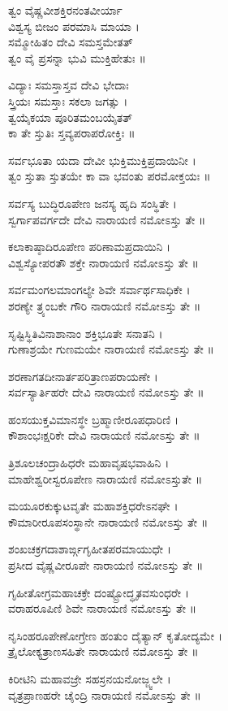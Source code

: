 ತ್ವಂ ವೈಷ್ಣವೀಶಕ್ತಿರನಂತವೀರ್ಯಾ\\
      ವಿಶ್ವಸ್ಯ ಬೀಜಂ ಪರಮಾಸಿ ಮಾಯಾ ।\\
ಸಮ್ಮೋಹಿತಂ ದೇವಿ ಸಮಸ್ತಮೇತತ್\\
      ತ್ವಂ ವೈ ಪ್ರಸನ್ನಾ ಭುವಿ ಮುಕ್ತಿಹೇತುಃ ॥

ವಿದ್ಯಾಃ ಸಮಸ್ತಾಸ್ತವ ದೇವಿ ಭೇದಾಃ\\
        ಸ್ತ್ರಿಯಃ ಸಮಸ್ತಾಃ ಸಕಲಾ ಜಗತ್ಸು ।\\
ತ್ವಯೈಕಯಾ ಪೂರಿತಮಂಬಯೈತತ್\\
        ಕಾ ತೇ ಸ್ತುತಿಃ ಸ್ತವ್ಯಪರಾಪರೋಕ್ತಿಃ ॥

ಸರ್ವಭೂತಾ ಯದಾ ದೇವೀ ಭುಕ್ತಿಮುಕ್ತಿಪ್ರದಾಯಿನೀ ।\\
ತ್ವಂ ಸ್ತುತಾ ಸ್ತುತಯೇ ಕಾ ವಾ ಭವಂತು ಪರಮೋಕ್ತಯಃ ॥

ಸರ್ವಸ್ಯ ಬುದ್ಧಿರೂಪೇಣ ಜನಸ್ಯ ಹೃದಿ ಸಂಸ್ಥಿತೇ ।\\
ಸ್ವರ್ಗಾಪವರ್ಗದೇ ದೇವಿ ನಾರಾಯಣಿ ನಮೋಽಸ್ತು ತೇ ॥

ಕಲಾಕಾಷ್ಠಾದಿರೂಪೇಣ ಪರಿಣಾಮಪ್ರದಾಯಿನಿ ।\\
ವಿಶ್ವಸ್ಯೋಪರತೌ ಶಕ್ತೇ ನಾರಾಯಣಿ ನಮೋಽಸ್ತು ತೇ ॥

ಸರ್ವಮಂಗಲಮಾಂಗಲ್ಯೇ ಶಿವೇ ಸರ್ವಾರ್ಥಸಾಧಿಕೇ ।\\
ಶರಣ್ಯೇ ತ್ರ್ಯಂಬಕೇ ಗೌರಿ ನಾರಾಯಣಿ ನಮೋಽಸ್ತು ತೇ ॥

ಸೃಷ್ಟಿಸ್ಥಿತಿವಿನಾಶಾನಾಂ ಶಕ್ತಿಭೂತೇ ಸನಾತನಿ ।\\
ಗುಣಾಶ್ರಯೇ ಗುಣಮಯೇ ನಾರಾಯಣಿ ನಮೋಽಸ್ತು ತೇ ॥

ಶರಣಾಗತದೀನಾರ್ತಪರಿತ್ರಾಣಪರಾಯಣೇ ।\\
ಸರ್ವಸ್ಯಾರ್ತಿಹರೇ ದೇವಿ ನಾರಾಯಣಿ ನಮೋಽಸ್ತು ತೇ ॥

ಹಂಸಯುಕ್ತವಿಮಾನಸ್ಥೇ ಬ್ರಹ್ಮಾಣೀರೂಪಧಾರಿಣಿ ।\\
ಕೌಶಾಂಭಃಕ್ಷರಿಕೇ ದೇವಿ ನಾರಾಯಣಿ ನಮೋಽಸ್ತು ತೇ ॥

ತ್ರಿಶೂಲಚಂದ್ರಾಹಿಧರೇ ಮಹಾವೃಷಭವಾಹಿನಿ ।\\
ಮಾಹೇಶ್ವರೀಸ್ವರೂಪೇಣ ನಾರಾಯಣಿ ನಮೋಽಸ್ತುತೇ ॥

ಮಯೂರಕುಕ್ಕುಟವೃತೇ ಮಹಾಶಕ್ತಿಧರೇಽನಘೇ ।\\
ಕೌಮಾರೀರೂಪಸಂಸ್ಥಾನೇ ನಾರಾಯಣಿ ನಮೋಽಸ್ತು ತೇ ॥

ಶಂಖಚಕ್ರಗದಾಶಾರ್ಙ್ಗಗೃಹೀತಪರಮಾಯುಧೇ ।\\
ಪ್ರಸೀದ ವೈಷ್ಣವೀರೂಪೇ ನಾರಾಯಣಿ ನಮೋಽಸ್ತು ತೇ ॥

ಗೃಹೀತೋಗ್ರಮಹಾಚಕ್ರೇ ದಂಷ್ಟ್ರೋದ್ಧೃತವಸುಂಧರೇ ।\\
ವರಾಹರೂಪಿಣಿ ಶಿವೇ ನಾರಾಯಣಿ ನಮೋಽಸ್ತು ತೇ ॥

ನೃಸಿಂಹರೂಪೇಣೋಗ್ರೇಣ ಹಂತುಂ ದೈತ್ಯಾನ್ ಕೃತೋದ್ಯಮೇ ।\\
ತ್ರೈಲೋಕ್ಯತ್ರಾಣಸಹಿತೇ ನಾರಾಯಣಿ ನಮೋಽಸ್ತು ತೇ ॥

ಕಿರೀಟಿನಿ ಮಹಾವಜ್ರೇ ಸಹಸ್ರನಯನೋಜ್ಜ್ವಲೇ ।\\
ವೃತ್ರಪ್ರಾಣಹರೇ ಚೈಂದ್ರಿ ನಾರಾಯಣಿ ನಮೋಽಸ್ತು ತೇ ॥

